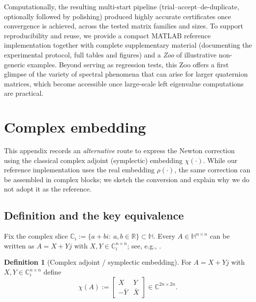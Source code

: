 \documentclass[preprint,12pt]{elsarticle}  %
\theoremstyle{definition}
\newtheorem{Def}{Definition}
\theoremstyle{definition}
\theoremstyle{definition}
\theoremstyle{definition}
\theoremstyle{definition}
\theoremstyle{remark}
\theoremstyle{remark}
\theoremstyle{remark}
\DeclareRobustCommand{\i}{\ensuremath{\mathbf{i}}}
\DeclareRobustCommand{\j}{\ensuremath{\mathbf{j}}}
\DeclareRobustCommand{\k}{\ensuremath{\mathbf{k}}}
\def\i{i}\def\j{j}\def\k{k}%
\newcommand{\RR}{\mathbb{R}}
\newcommand{\CC}{\mathbb{C}}
\newcommand{\HH}{\mathbb{H}}
\begin{document}
Computationally, the resulting multi-start pipeline (trial--accept--de-du\-pli\-cate, optionally followed by polishing) produced highly accurate certificates once convergence is achieved, across the tested matrix families and sizes. To support reproducibility and reuse, we provide a compact MATLAB reference implementation together with complete supplementary material (documenting the experimental protocol, full tables and figures) and a \emph{Zoo} of illustrative non-generic examples.
Beyond serving as regression tests, this Zoo offers a first glimpse of the variety of spectral phenomena that can arise for larger quaternion matrices, which become accessible once large-scale left eigenvalue computations are practical.


\appendix

\section{Complex embedding}
\label{app:complex_embedding}
This appendix records an \emph{alternative} route to express the Newton correction using the classical complex adjoint (symplectic) embedding $\chi(\cdot)$. While our reference implementation uses the real embedding $\rho(\cdot)$, the same correction can be assembled in complex blocks; we sketch the conversion and explain why we do not adopt it as the reference.

\subsection{Definition and the key equivalence}
Fix the complex slice $\CC_\i:=\{a+b\i:\ a,b\in\RR\}\subset\HH$. Every $A\in\HH^{n\times n}$ can be written as
$A=X+Y\j$ with $X,Y\in\CC_\i^{n\times n}$; see, e.g., \cite{Zhang1997,Rodman2014}.

\begin{Def}[Complex adjoint / symplectic embedding]
\label{def:chi}
For $A=X+Y\j$ with $X,Y\in\CC_\i^{n\times n}$ define
\[
\chi(A):=
\begin{bmatrix}
X & Y\\
-\overline{Y} & \overline{X}
\end{bmatrix}\in\CC^{2n\times 2n}.
\]

\end{Def}
\end{document}
